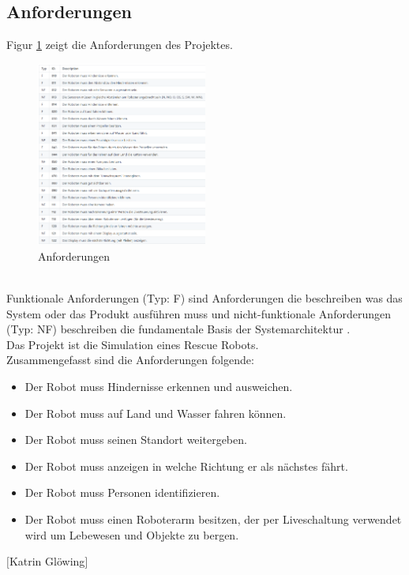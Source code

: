 \subsection{Anforderungen}
Figur \ref{fig:anforderungen} zeigt die Anforderungen des Projektes.
\begin{figure}[htbp] 
  \centering
     \includegraphics[width=0.5\textwidth]{Bilder/requirements.PNG}
  \caption{Anforderungen}
  \label{fig:anforderungen}
\end{figure}\\
Funktionale Anforderungen (Typ: F) sind Anforderungen die beschreiben was das System oder das Produkt ausführen muss \cite{b1} und nicht-funktionale Anforderungen (Typ: NF) beschreiben die fundamentale Basis der Systemarchitektur \cite{b2}.\\
Das Projekt ist die Simulation eines Rescue Robots.\\
Zusammengefasst sind die Anforderungen folgende: 
\begin{itemize}
    \item Der Robot muss Hindernisse erkennen und ausweichen.
    \item Der Robot muss auf Land und Wasser fahren können.
    \item Der Robot muss seinen Standort weitergeben.
    \item Der Robot muss anzeigen in welche Richtung er als nächstes fährt.
    \item Der Robot muss Personen identifizieren.
    \item Der Robot muss einen Roboterarm besitzen, der per Liveschaltung verwendet wird um Lebewesen und Objekte zu bergen.
\end{itemize}
\begin{flushright}
	$ [ $Katrin Glöwing$ ] $
\end{flushright}
